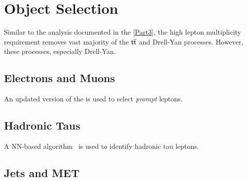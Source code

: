 \chapter{Object Selection}
\label{chap:Obj}

Similar to the analysis documented in the \autoref{Part3}, the high lepton multiplicity requirement removes vast majority of the $\textsf{t}\overline{\textsf{t}}$ and Drell-Yan processes. However, these processes, especially Drell-Yan.

\section{Electrons and Muons}
\label{sec:EandM}

An updated version of the \TOP\cite{CMS:2023ftu} is used to select \emph{prompt} leptons.

\section{Hadronic Taus}
\label{sec:Taus}

A \ac{NN}-based algorithm~\cite{CMS:2022prd} is used to identify hadronic tau leptons.

\section{Jets and MET}
\label{sec:JME}



